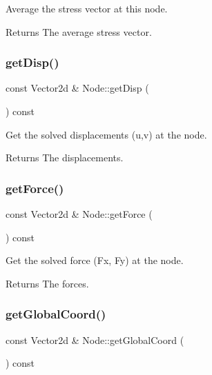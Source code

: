 Average the stress vector at this node. 

\begin{DoxyReturn}{Returns}
The average stress vector. 
\end{DoxyReturn}
\mbox{\label{class_node_a2024b690427f7840b18dc429d4acba7d}} 
\subsubsection{\texorpdfstring{get\+Disp()}{getDisp()}}
{\footnotesize\ttfamily const Vector2d \& Node\+::get\+Disp (\begin{DoxyParamCaption}{ }\end{DoxyParamCaption}) const}



Get the solved displacements (u,v) at the node. 

\begin{DoxyReturn}{Returns}
The displacements. 
\end{DoxyReturn}
\mbox{\label{class_node_acb1728229a234694419ecda6ad5928c4}} 
\subsubsection{\texorpdfstring{get\+Force()}{getForce()}}
{\footnotesize\ttfamily const Vector2d \& Node\+::get\+Force (\begin{DoxyParamCaption}{ }\end{DoxyParamCaption}) const}



Get the solved force (Fx, Fy) at the node. 

\begin{DoxyReturn}{Returns}
The forces. 
\end{DoxyReturn}
\mbox{\label{class_node_ab0129116eb1cff646bd53b8120cd34e6}} 
\subsubsection{\texorpdfstring{get\+Global\+Coord()}{getGlobalCoord()}}
{\footnotesize\ttfamily const Vector2d \& Node\+::get\+Global\+Coord (\begin{DoxyParamCaption}{ }\end{DoxyParamCaption}) const}




